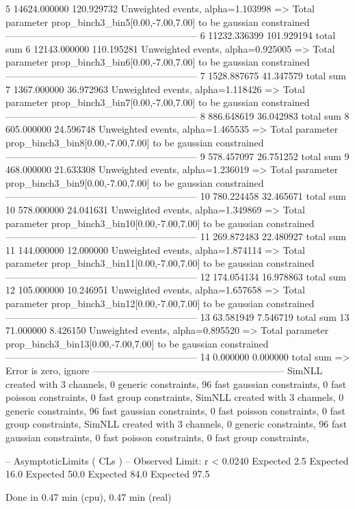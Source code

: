 5          14624.000000    120.929732      Unweighted events, alpha=1.103998
  => Total parameter prop_binch3_bin5[0.00,-7.00,7.00] to be gaussian constrained
------------------------------------------------------------
6          11232.336399    101.929194      total sum                     
6          12143.000000    110.195281      Unweighted events, alpha=0.925005
  => Total parameter prop_binch3_bin6[0.00,-7.00,7.00] to be gaussian constrained
------------------------------------------------------------
7          1528.887675     41.347579       total sum                     
7          1367.000000     36.972963       Unweighted events, alpha=1.118426
  => Total parameter prop_binch3_bin7[0.00,-7.00,7.00] to be gaussian constrained
------------------------------------------------------------
8          886.648619      36.042983       total sum                     
8          605.000000      24.596748       Unweighted events, alpha=1.465535
  => Total parameter prop_binch3_bin8[0.00,-7.00,7.00] to be gaussian constrained
------------------------------------------------------------
9          578.457097      26.751252       total sum                     
9          468.000000      21.633308       Unweighted events, alpha=1.236019
  => Total parameter prop_binch3_bin9[0.00,-7.00,7.00] to be gaussian constrained
------------------------------------------------------------
10         780.224458      32.465671       total sum                     
10         578.000000      24.041631       Unweighted events, alpha=1.349869
  => Total parameter prop_binch3_bin10[0.00,-7.00,7.00] to be gaussian constrained
------------------------------------------------------------
11         269.872483      22.480927       total sum                     
11         144.000000      12.000000       Unweighted events, alpha=1.874114
  => Total parameter prop_binch3_bin11[0.00,-7.00,7.00] to be gaussian constrained
------------------------------------------------------------
12         174.054134      16.978863       total sum                     
12         105.000000      10.246951       Unweighted events, alpha=1.657658
  => Total parameter prop_binch3_bin12[0.00,-7.00,7.00] to be gaussian constrained
------------------------------------------------------------
13         63.581949       7.546719        total sum                     
13         71.000000       8.426150        Unweighted events, alpha=0.895520
  => Total parameter prop_binch3_bin13[0.00,-7.00,7.00] to be gaussian constrained
------------------------------------------------------------
14         0.000000        0.000000        total sum                     
  => Error is zero, ignore      
------------------------------------------------------------
SimNLL created with 3 channels, 0 generic constraints, 96 fast gaussian constraints, 0 fast poisson constraints, 0 fast group constraints, 
SimNLL created with 3 channels, 0 generic constraints, 96 fast gaussian constraints, 0 fast poisson constraints, 0 fast group constraints, 
SimNLL created with 3 channels, 0 generic constraints, 96 fast gaussian constraints, 0 fast poisson constraints, 0 fast group constraints, 

 -- AsymptoticLimits ( CLs ) --
Observed Limit: r < 0.0240
Expected  2.5%
Expected 16.0%
Expected 50.0%
Expected 84.0%
Expected 97.5%

Done in 0.47 min (cpu), 0.47 min (real)
